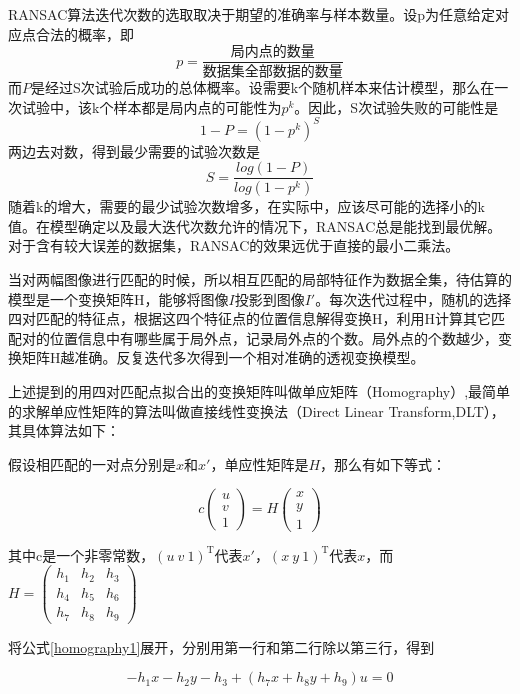 RANSAC算法迭代次数的选取取决于期望的准确率与样本数量。设p为任意给定对应点合法的概率，即
\[p = \frac{\text{局内点的数量}}{\text{数据集全部数据的数量}}\]
而\(P\)是经过S次试验后成功的总体概率。设需要k个随机样本来估计模型，那么在一次试验中，该k个样本都是局内点的可能性为\(p^k\)。因此，S次试验失败的可能性是
\[1 - P = (1 - p^k)^S\]
两边去对数，得到最少需要的试验次数是
\[S = \frac{log(1-P)}{log(1-p^k)}\]
随着k的增大，需要的最少试验次数增多，在实际中，应该尽可能的选择小的k值。在模型确定以及最大迭代次数允许的情况下，RANSAC总是能找到最优解。对于含有较大误差的数据集，RANSAC的效果远优于直接的最小二乘法。

当对两幅图像进行匹配的时候，所以相互匹配的局部特征作为数据全集，待估算的模型是一个变换矩阵H，能够将图像\(I\)投影到图像\(I'\)。每次迭代过程中，随机的选择四对匹配的特征点，根据这四个特征点的位置信息解得变换H，利用H计算其它匹配对的位置信息中有哪些属于局外点，记录局外点的个数。局外点的个数越少，变换矩阵H越准确。反复迭代多次得到一个相对准确的透视变换模型。

上述提到的用四对匹配点拟合出的变换矩阵叫做单应矩阵（Homography）,最简单的求解单应性矩阵的算法叫做直接线性变换法（Direct Linear Transform,DLT）\cite{Dubrofsky:2009tz}，其具体算法如下：

假设相匹配的一对点分别是\(x\)和\(x'\)，单应性矩阵是\(H\)，那么有如下等式：

\begin{equation}
\label{homography1}
	c
	\begin{pmatrix}
	u \\
	v \\
	1
	\end{pmatrix}
	= H
	\begin{pmatrix}
	x \\
	y \\
	1
	\end{pmatrix}
\end{equation}


其中c是一个非零常数，\((u\ v\ 1)^\mathrm{T}\)代表\(x'\)，\((x \ y \ 1)^\mathrm{T}\)代表\(x\)，而
\(
H = 
\begin{pmatrix}
h_1 & h_2 & h_3 \\
h_4 & h_5 & h_6 \\
h_7 & h_8 & h_9
\end{pmatrix}
\)

将公式\eqref{homography1}展开，分别用第一行和第二行除以第三行，得到

\begin{equation}
\label{homography2}
-h_1x - h_2y - h_3 + (h_7x+h_8y+h_9)u = 0
\end{equation}

